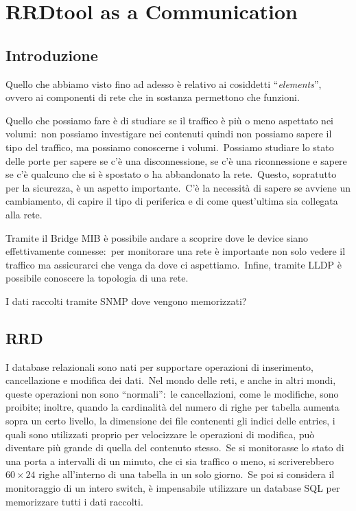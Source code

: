 \chapter{RRDtool as a Communication}

\section{Introduzione}

Quello che abbiamo visto fino ad adesso è relativo ai cosiddetti ``\textit{elements}'', ovvero ai componenti di rete che in sostanza permettono che funzioni.\

Quello che possiamo fare è di studiare se il traffico è più o meno aspettato nei volumi:\ non possiamo investigare nei contenuti quindi non possiamo sapere il tipo del traffico, ma possiamo conoscerne i volumi.\
Possiamo studiare lo stato delle porte per sapere se c'è una disconnessione, se c'è una riconnessione e sapere se c'è qualcuno che si è spostato o ha abbandonato la rete.\
Questo, sopratutto per la sicurezza, è un aspetto importante.\
C'è la necessità di sapere se avviene un cambiamento, di capire il tipo di periferica e di come quest'ultima sia collegata alla rete.\

Tramite il Bridge MIB è possibile andare a scoprire dove le device siano effettivamente connesse:\ per monitorare una rete è importante non solo vedere il traffico ma assicurarci che venga da dove ci aspettiamo.\
Infine, tramite LLDP è possibile conoscere la topologia di una rete.\

\begin{center}
    I dati raccolti tramite SNMP dove vengono memorizzati?
\end{center}

\section{RRD}

I database relazionali sono nati per supportare operazioni di inserimento, cancellazione e modifica dei dati.\
Nel mondo delle reti, e anche in altri mondi, queste operazioni non sono ``normali'':\ le cancellazioni, come le modifiche, sono proibite;
inoltre, quando la cardinalità del numero di righe per tabella aumenta sopra un certo livello, la dimensione dei file contenenti gli indici delle entries, i quali sono utilizzati proprio per velocizzare le operazioni di modifica, può diventare più grande di quella del contenuto stesso.\
Se si monitorasse lo stato di una porta a intervalli di un minuto, che ci sia traffico o meno, si scriverebbero $60 \times 24$ righe all'interno di una tabella in un solo giorno.\
Se poi si considera il monitoraggio di un intero switch, è impensabile utilizzare un database SQL per memorizzare tutti i dati raccolti.\

